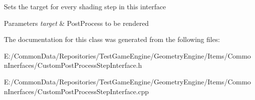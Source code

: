 Sets the target for every shading step in this interface 
\begin{DoxyParams}{Parameters}
{\em target} & Post\+Process to be rendered \\
\hline
\end{DoxyParams}


The documentation for this class was generated from the following files\+:\begin{DoxyCompactItemize}
\item 
E\+:/\+Common\+Data/\+Repositories/\+Test\+Game\+Engine/\+Geometry\+Engine/\+Items/\+Common\+Inerfaces/Custom\+Post\+Process\+Step\+Interface.\+h\item 
E\+:/\+Common\+Data/\+Repositories/\+Test\+Game\+Engine/\+Geometry\+Engine/\+Items/\+Common\+Inerfaces/Custom\+Post\+Process\+Step\+Interface.\+cpp\end{DoxyCompactItemize}
